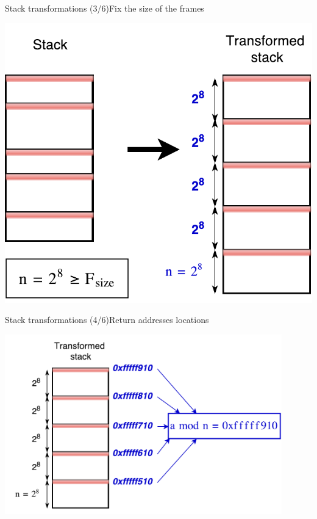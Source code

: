 \documentclass{beamer}
\begin{document}
\begin{frame}[c]{Stack transformations (3/6)}{Fix the size of the frames}
	\begin{center}
		\includegraphics[height=0.7\textheight]{images/stack_transfo_2.pdf}
	\end{center}
\end{frame}
\begin{frame}[c]{Stack transformations (4/6)}{Return addresses locations}
	\begin{center}
   		\includegraphics[width=0.9\textwidth]{images/stack_transfo_3.pdf}
	\end{center}
\end{frame}
\end{document}
